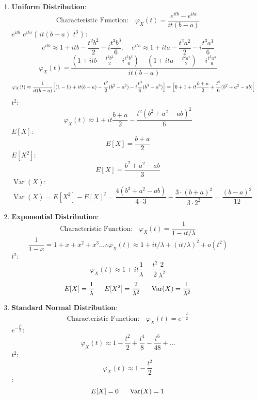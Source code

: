 \begin{enumerate}[label=(\alph*)]
\begin{enumerate}[label=(\alph*)]
\item
\textbf{Uniform Distribution}:
\[
\text{Characteristic Function:} \quad \varphi_X(t) = \frac{e^{itb} - e^{ita}}{it(b-a)}
\]
 \( e^{itb} \)  \( e^{ita} \) (    \(it(b-a) \)  \(t^3\) ) : 
\[
e^{itb} \approx 1 + itb - \frac{t^2b^2}{2} - i\frac{t^3b^3}{6}, \quad e^{ita} \approx 1 + ita - \frac{t^2a^2}{2} - i\frac{t^3a^3}{6}
\]
\[
\varphi_X(t) = \frac{(1 + itb - \frac{t^2b^2}{2}- i\frac{t^3b^3}{6}) - (1 + ita - \frac{t^2a^2}{2}) - i\frac{t^3a^3}{6}}{it(b-a)}
\]
\[
\varphi_X(t) \approx \frac{1}{it(b-a)} \Bigl[ (1-1)+ it(b-a) -\dfrac{t^2}{2}(b^2-a^2) -i\dfrac{t^3}{6}(b^3-a^3) \Bigr] = \Bigl[ 0 + 1 +it\dfrac{b+a}{2}  + \dfrac{t^2}{6} (b^2+a^2 -ab) \Bigr]
\]
 \( t^2 \):
\[
\varphi_X(t) \approx 1 + it\frac{b+a}{2} - \frac{t^2(b^2 + a^2-ab)^2}{6}
\]
 \( E[X] \):
\[
E[X] = \frac{b+a}{2}
\]
 \( E[X^2] \):
\[
E[X] = \frac{b^2+a^2-ab}{3}
\]
 \( \operatorname{Var}(X) \):
\[
\operatorname{Var}(X) = E[X^2] - E[X]^2 =  \frac{4(b^2+a^2-ab)}{4\cdot3} - \frac{3\cdot(b+a)^2}{3\cdot2^2}  = \frac{(b-a)^2}{12}
\]


\item
\textbf{Exponential Distribution}:
\[
\text{Characteristic Function:} \quad \varphi_X(t) = \frac{1}{1 - it/\lambda}
\]
\[
\frac{1}{1-x} = 1 +x + x^2 +x^3... \therefore \varphi_X(t) \approx 1 + it/\lambda + (it/\lambda)^2 + o(t^2)
\]
 \( t^2 \):
\[
\varphi_X(t) \approx 1 + it \dfrac{1}{\lambda} - \frac{t^2}{2} \frac{2}{\lambda^2}
\]
\[
E[X] = \frac{1}{\lambda} \hspace{15pt} E[X^2] = \frac{2}{\lambda^2} \hspace*{15pt} \operatorname{Var}(X) = \frac{1}{\lambda^2}
\]


\item
\textbf{Standard Normal Distribution}:
\[
\text{Characteristic Function:} \quad \varphi_X(t) = e^{-\frac{t^2}{2}}
\]
 \( e^{-\frac{t^2}{2}} \):
\[
\varphi_X(t) \approx 1 - \frac{t^2}{2} + \frac{t^4}{8} - \frac{t^6}{48} + \ldots
\]
 \( t^2 \):
\[
\varphi_X(t) \approx 1 - \frac{t^2}{2}
\]
:
\[
E[X] = 0 \hspace*{15pt} \operatorname{Var}(X) = 1
\]




\end{enumerate}


\end{enumerate}
